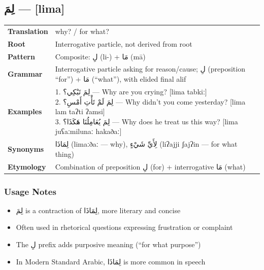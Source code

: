 \documentclass[letterpaper,12pt]{article}
\begin{document}
\subsection{\textarabic{لِمَ} — [lima]}
\begin{tabular}{p{3cm}p{10cm}}
\toprule
\textbf{Translation} & why? / for what? \\
\textbf{Root} & Interrogative particle, not derived from root \\
\textbf{Pattern} & Composite: \textarabic{لِ} (li-) + \textarabic{مَا} (mā) \\
\textbf{Grammar} & Interrogative particle asking for reason/cause; \textarabic{لِ} (preposition ``for'') + \textarabic{مَا} (``what''), with elided final alif \\
\midrule
\textbf{Examples} & \makecell[l]{\parbox{9.5cm}{
1. \textarabic{لِمَ تَبْكِي؟} — Why are you crying? [lima tabkiː]\\
2. \textarabic{لِمَ لَمْ تَأْتِ أَمْسِ؟} — Why didn't you come yesterday? [lima lam taʔti ʔamsi]\\
3. \textarabic{لِمَ يُعَامِلُنَا هَكَذَا؟} — Why does he treat us this way? [lima juʕaːmilunaː hakaðaː]
}} \\
\midrule
\textbf{Synonyms} & \textarabic{لِمَاذَا} (limaːðaː — why), \textarabic{لِأَيِّ شَيْءٍ} (liʔajji ʃajʔin — for what thing) \\
\textbf{Etymology} & Combination of preposition \textarabic{لِ} (for) + interrogative \textarabic{مَا} (what) \\
\bottomrule
\end{tabular}

\subsubsection*{Usage Notes}
\begin{itemize}
\item \textarabic{لِمَ} is a contraction of \textarabic{لِمَاذَا}, more literary and concise
\item Often used in rhetorical questions expressing frustration or complaint
\item The \textarabic{لِ} prefix adds purposive meaning (``for what purpose'')
\item In Modern Standard Arabic, \textarabic{لِمَاذَا} is more common in speech
\end{itemize}
\end{document}
